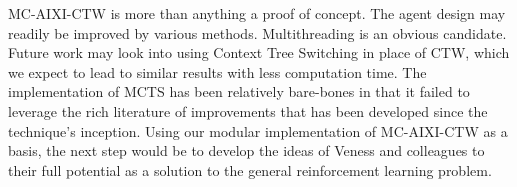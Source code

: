\documentclass{article}
\theoremstyle{definition}
\newtheorem{primary statistics}[definition]{Primary Statistics}
\newtheorem{auxiliary statistics}[definition]{Auxiliary Statistics}
\begin{document}
MC-AIXI-CTW is more than anything a proof of concept. The agent design may readily be improved by various methods. Multithreading is an obvious candidate. Future work may look into using Context Tree Switching in place of CTW, which we expect to lead to similar results with less computation time. The implementation of MCTS has been relatively bare-bones in that it failed to leverage the rich literature of improvements that has been developed since the technique's inception. Using our modular implementation of MC-AIXI-CTW as a basis, the next step would be to develop the ideas of Veness and colleagues to their full potential as a solution to the general reinforcement learning problem. 

\printbibliography
\end{document}
